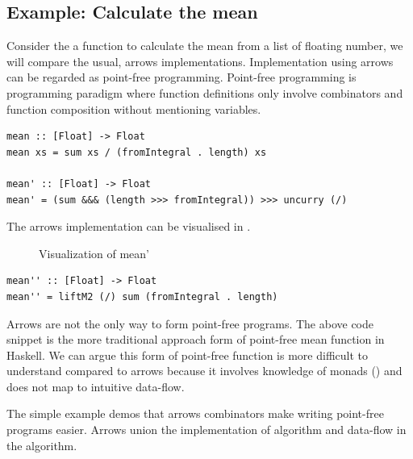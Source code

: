 \subsection{Example: Calculate the mean}
Consider the a function to calculate the mean from a list of floating number, we will compare the usual, arrows implementations. Implementation using arrows can be regarded as point-free programming. Point-free programming is programming paradigm where function definitions only involve combinators and function composition without mentioning variables\cite{TacitProgramming2019}. 

\begin{verbatim}
mean :: [Float] -> Float
mean xs = sum xs / (fromIntegral . length) xs

mean' :: [Float] -> Float
mean' = (sum &&& (length >>> fromIntegral)) >>> uncurry (/)
\end{verbatim}
The arrows implementation can be visualised in .
\begin{figure}[!ht]
  \centering
  \caption{Visualization of mean'}\label{b:ar:p2}
\end{figure}
\begin{verbatim}
mean'' :: [Float] -> Float
mean'' = liftM2 (/) sum (fromIntegral . length)
\end{verbatim}
Arrows are not the only way to form point-free programs. The above code snippet is the more traditional approach form of point-free mean function in Haskell. We can argue this form of point-free function is more difficult to understand compared to arrows because it involves knowledge of monads () and does not map to intuitive data-flow.

The simple example demos that arrows combinators make writing point-free programs easier. Arrows union the implementation of algorithm and data-flow in the algorithm. 

